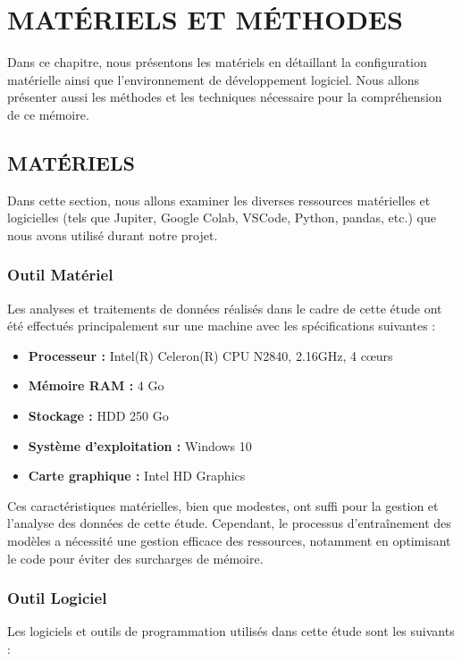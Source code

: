 \chapter{MATÉRIELS ET MÉTHODES}
Dans ce chapitre, nous présentons les matériels en détaillant la configuration matérielle ainsi que l’environnement de développement logiciel. Nous allons présenter aussi les méthodes et les techniques nécessaire pour la compréhension de ce mémoire.
\section{MATÉRIELS}
Dans cette section, nous allons examiner les diverses ressources matérielles et logicielles (tels que Jupiter, Google Colab, VSCode, Python, pandas, etc.) que nous avons utilisé durant notre projet.
\subsection{Outil Matériel}
Les analyses et traitements de données réalisés dans le cadre de cette étude ont été effectués principalement sur une machine avec les spécifications suivantes :

\begin{itemize}
	\item \textbf{Processeur :} Intel(R) Celeron(R) CPU N2840, 2.16GHz, 4 cœurs
	\item \textbf{Mémoire RAM :} 4 Go
	\item \textbf{Stockage :} HDD 250 Go
	\item \textbf{Système d'exploitation :} Windows 10
	\item \textbf{Carte graphique :} Intel HD Graphics
\end{itemize}

Ces caractéristiques matérielles, bien que modestes, ont suffi pour la gestion et l'analyse des données de cette étude. Cependant, le processus d'entraînement des modèles a nécessité une gestion efficace des ressources, notamment en optimisant le code pour éviter des surcharges de mémoire.

\subsection{Outil Logiciel}
Les logiciels et outils de programmation utilisés dans cette étude sont les suivants :

